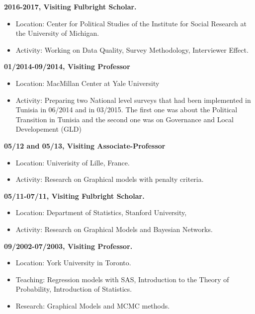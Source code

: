 \documentclass[]{article}
\begin{document}
\textbf{2016-2017, Visiting Fulbright Scholar.}

\begin{itemize}
\item
  Location: Center for Political Studies of the Institute for Social
  Research at the University of Michigan.
\item
  Activity: Working on Data Quality, Survey Methodology, Interviewer
  Effect.
\end{itemize}

\textbf{01/2014-09/2014, Visiting Professor}

\begin{itemize}
\item
  Location: MacMillan Center at Yale University
\item
  Activity: Preparing two National level surveys that had been
  implemented in Tunisia in 06/2014 and in 03/2015. The first one was
  about the Political Transition in Tunisia and the second one was on
  Governance and Local Developement (GLD)
\end{itemize}

\textbf{05/12 and 05/13, Visiting Associate-Professor}

\begin{itemize}
\item
  Location: Univerisity of Lille, France.
\item
  Activity: Research on Graphical models with penalty criteria.
\end{itemize}

\textbf{05/11-07/11, Visiting Fulbright Scholar.}

\begin{itemize}
\item
  Location: Department of Statistics, Stanford University,
\item
  Activity: Research on Graphical Models and Bayesian Networks.
\end{itemize}

\textbf{09/2002-07/2003, Visiting Professor.}

\begin{itemize}
\item
  Location: York University in Toronto.
\item
  Teaching: Regression models with SAS, Introduction to the Theory of
  Probability, Introduction of Statistics.
\item
  Research: Graphical Models and MCMC methods.
\end{itemize}
\end{document}
